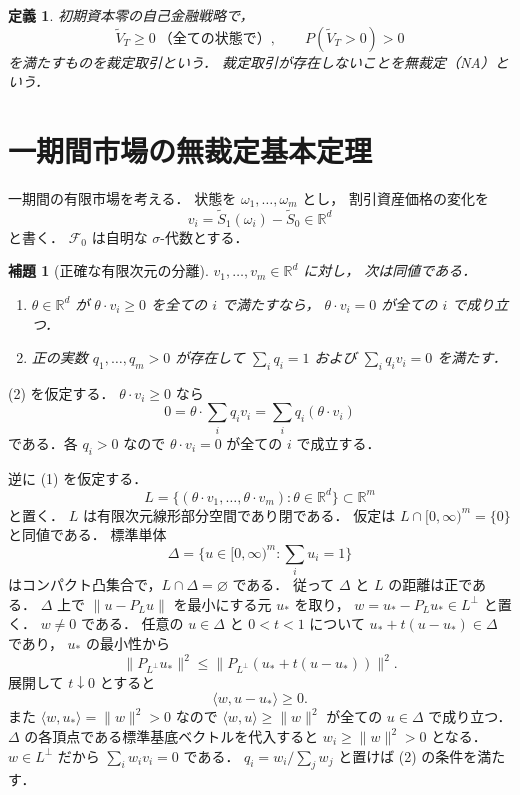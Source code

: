 \documentclass[a5paper,10pt,onecolumn]{jsarticle}
\makeatletter
\theoremstyle{mathnotetheorem}
\newtheorem{definition}[theorem]{定義}
\newtheorem{lemma}[theorem]{補題}
\renewcommand{\proofname}{証明}
\renewenvironment{proof}[1][\proofname]{%
  \par\pushQED{\qed}\normalfont\topsep4\p@\@plus2\p@\relax
  \trivlist\item[\hskip\labelsep\bfseries #1]\ignorespaces
}{\popQED\endtrivlist\@endpefalse}
\newcommand{\norm}[1]{\lVert #1\rVert}
\makeatother
\begin{document}
\begin{definition}
初期資本零の自己金融戦略で，
\[
 \widetilde V_T\ge0\ \text{（全ての状態で）},\qquad
 P(\widetilde V_T>0)>0
\]
を満たすものを\emph{裁定取引}という．
裁定取引が存在しないことを\emph{無裁定}（NA）という．
\end{definition}

\section{一期間市場の無裁定基本定理}

一期間の有限市場を考える．
状態を $\omega_1,\dots,\omega_m$ とし，
割引資産価格の変化を
\[
 v_i=\widetilde S_1(\omega_i)-\widetilde S_0
 \in\mathbb R^d
\]
と書く．
$\mathcal F_0$ は自明な $\sigma$-代数とする．

\begin{lemma}[正確な有限次元の分離]\label{lem:finite-alternative}
$v_1,\dots,v_m\in\mathbb R^d$ に対し，
次は同値である．
\begin{enumerate}
\item $\theta\in\mathbb R^d$ が
$\theta\cdot v_i\ge0$ を全ての $i$ で満たすなら，
$\theta\cdot v_i=0$ が全ての $i$ で成り立つ．
\item 正の実数 $q_1,\dots,q_m>0$ が存在して
$\sum_iq_i=1$ および
$\sum_iq_iv_i=0$ を満たす．
\end{enumerate}
\end{lemma}
\begin{proof}
(2) を仮定する．
$\theta\cdot v_i\ge0$ なら
\[
 0=\theta\cdot\sum_iq_iv_i
 =\sum_iq_i(\theta\cdot v_i)
\]
である．各 $q_i>0$ なので
$\theta\cdot v_i=0$ が全ての $i$ で成立する．

逆に (1) を仮定する．
\[
 L=\{(\theta\cdot v_1,\dots,\theta\cdot v_m):
 \theta\in\mathbb R^d\}\subset\mathbb R^m
\]
と置く．
$L$ は有限次元線形部分空間であり閉である．
仮定は $L\cap[0,\infty)^m=\{0\}$ と同値である．
標準単体
\[
 \Delta=\{u\in[0,\infty)^m:\sum_iu_i=1\}
\]
はコンパクト凸集合で，$L\cap\Delta=\varnothing$ である．
従って $\Delta$ と $L$ の距離は正である．
$\Delta$ 上で
$\norm{u-P_Lu}$ を最小にする元 $u_*$ を取り，
$w=u_*-P_Lu_*\in L^\perp$ と置く．
$w\ne0$ である．
任意の $u\in\Delta$ と $0<t<1$ について
$u_*+t(u-u_*)\in\Delta$ であり，
$u_*$ の最小性から
\[
 \norm{P_{L^\perp}u_*}^2
 \le\norm{P_{L^\perp}(u_*+t(u-u_*))}^2.
\]
展開して $t\downarrow0$ とすると
\[
 \langle w,u-u_*\rangle\ge0.
\]
また $\langle w,u_*\rangle=\norm w^2>0$ なので
$\langle w,u\rangle\ge\norm w^2$ が全ての $u\in\Delta$ で成り立つ．
$\Delta$ の各頂点である標準基底ベクトルを代入すると
$w_i\ge\norm w^2>0$ となる．
$w\in L^\perp$ だから
$\sum_iw_iv_i=0$ である．
$q_i=w_i/\sum_jw_j$ と置けば
(2) の条件を満たす．
\end{proof}
\end{document}
